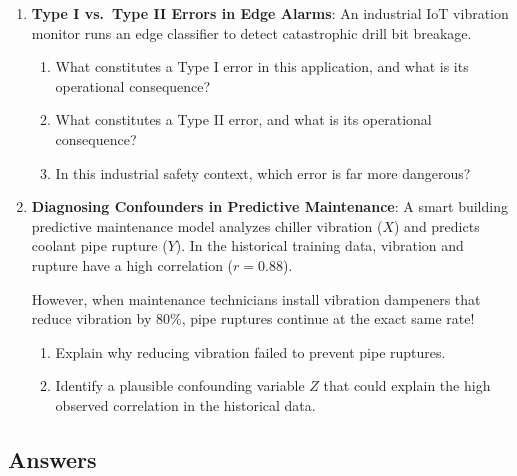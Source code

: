 \begin{checkyourself}
\begin{enumerate}
    Conduct a one-tailed hypothesis test at $\alpha = 0.05$ to determine whether the batch violates the specification ($H_1: \mu > 15.0$). (For $df = 24$, $t_{0.05, 24}^* = 1.711$).

    \item \textbf{Type I vs.\ Type II Errors in Edge Alarms}:
    An industrial IoT vibration monitor runs an edge classifier to detect catastrophic drill bit breakage.
    \begin{enumerate}[label=(\alph*)]
        \item What constitutes a Type I error in this application, and what is its operational consequence?
        \item What constitutes a Type II error, and what is its operational consequence?
        \item In this industrial safety context, which error is far more dangerous?
    \end{enumerate}

    \item \textbf{Diagnosing Confounders in Predictive Maintenance}:
    A smart building predictive maintenance model analyzes chiller vibration ($X$) and predicts coolant pipe rupture ($Y$). In the historical training data, vibration and rupture have a high correlation ($r = 0.88$). 
    
    However, when maintenance technicians install vibration dampeners that reduce vibration by $80\%$, pipe ruptures continue at the exact same rate!
    \begin{enumerate}[label=(\alph*)]
        \item Explain why reducing vibration failed to prevent pipe ruptures.
        \item Identify a plausible confounding variable $Z$ that could explain the high observed correlation in the historical data.
    \end{enumerate}
\end{enumerate}
\end{checkyourself}

\subsection*{Answers}

